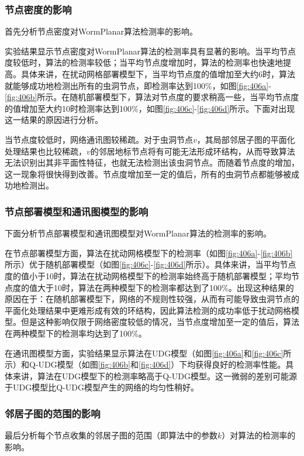 \subsubsection{节点密度的影响}
首先分析节点密度对WormPlanar算法检测率的影响。

实验结果显示节点密度对WormPlanar算法的检测率具有显著的影响。当平均节点度较低时，算法的检测率较低；当平均节点度增加时，算法的检测率也快速地提高。具体来讲，在扰动网格部署模型下，当平均节点度的值增加至大约6时，算法就能够成功地检测出所有的虫洞节点，即检测率达到100\%，如图\ref{fig:406a}-\ref{fig:406b}所示。在随机部署模型下，算法对节点度的要求稍高一些，当平均节点度的值增加至大约10时检测率达到100\%，如图\ref{fig:406c}-\ref{fig:406d}所示。下面对出现这一结果的原因进行分析。

当节点度较低时，网络通讯图较稀疏。对于虫洞节点$v$，其局部邻居子图的平面化处理结果也比较稀疏，$v$的邻居地标节点将有可能无法形成环结构，从而导致算法无法识别出其非平面性特征，也就无法检测出该虫洞节点。而随着节点度的增加，这一现象将很快得到改善。节点度增加至一定的值后，所有的虫洞节点都能够被成功地检测出。
\subsubsection{节点部署模型和通讯图模型的影响}
下面分析节点部署模型和通讯图模型对WormPlanar算法的检测率的影响。

在节点部署模型方面，算法在扰动网格模型下的检测率（如图\ref{fig:406a}-\ref{fig:406b}所示）优于随机部署模型（如图\ref{fig:406c}-\ref{fig:406d}所示）。具体来讲，当平均节点度的值小于10时，算法在扰动网格模型下的检测率始终高于随机部署模型；平均节点度的值大于10时，算法在两种模型下的检测率都达到了100\%。出现这种结果的原因在于：在随机部署模型下，网络的不规则性较强，从而有可能导致虫洞节点的平面化处理结果中更难形成有效的环结构，因此算法检测的成功率低于扰动网格模型。但是这种影响仅限于网络密度较低的情况，当节点度增加至一定的值后，算法在两种模型下的检测率均达到了100\%。

在通讯图模型方面，实验结果显示算法在UDG模型（如图\ref{fig:406a}和\ref{fig:406c}所示）和Q-UDG模型（如图\ref{fig:406b}和\ref{fig:406d}）下均获得良好的检测率性能。具体来讲，算法在UDG模型下的检测率略高于Q-UDG模型。这一微弱的差别可能源于UDG模型比Q-UDG模型产生的网络的均匀性稍好。
\subsubsection{邻居子图的范围的影响}
最后分析每个节点收集的邻居子图的范围（即算法中的参数$k$）对算法的检测率的影响。

